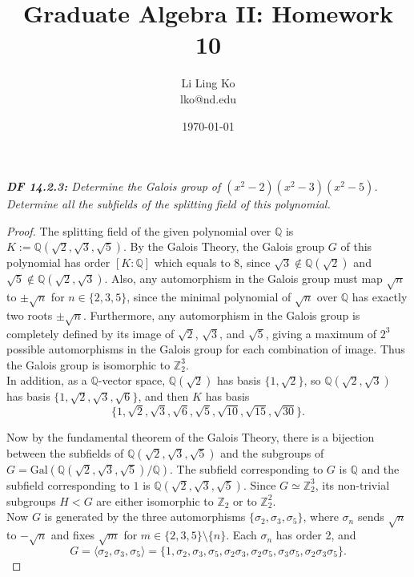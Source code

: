 \documentclass{article}
\begin{document}
\title{Graduate Algebra II: Homework 10}
\author{Li Ling Ko\\ lko@nd.edu}
\date{\today}
\maketitle

\it \textbf{DF 14.2.3:} Determine the Galois group of
  $(x^2-2)(x^2-3)(x^2-5)$. Determine all the subfields of the splitting
  field of this polynomial.

  \begin{proof}
    The splitting field of the given polynomial over $\mathbb{Q}$ is
    $K:=\mathbb{Q}(\sqrt{2},\sqrt{3},\sqrt{5})$. By the Galois Theory, the
    Galois group $G$ of this polynomial has order
    $[K:\mathbb{Q}]$ which equals to
    8, since $\sqrt{3}\not\in\mathbb{Q}(\sqrt{2})$ and
    $\sqrt{5}\not\in\mathbb{Q}(\sqrt{2},\sqrt{3})$. Also, any automorphism
    in the Galois group must map $\sqrt{n}$ to $\pm\sqrt{n}$ for
    $n\in\{2,3,5\}$, since the minimal polynomial of $\sqrt{n}$ over
    $\mathbb{Q}$ has exactly two roots $\pm\sqrt{n}$. Furthermore, any
    automorphism in the Galois group is completely defined by its image of
    $\sqrt{2}$, $\sqrt{3}$, and $\sqrt{5}$, giving a maximum of $2^3$
    possible automorphisms in the Galois group for each combination of
    image. Thus the Galois group is isomorphic to $\mathbb{Z}_2^3$. \\

    In addition, as a $\mathbb{Q}$-vector space,
    $\mathbb{Q}(\sqrt{2})$ has basis $\{1,\sqrt{2}\}$, so
    $\mathbb{Q}(\sqrt{2},\sqrt{3})$ has basis
    $\{1,\sqrt{2},\sqrt{3},\sqrt{6}\}$, and then $K$ has basis
    \[\{1,\sqrt{2},\sqrt{3},\sqrt{6},
    \sqrt{5},\sqrt{10},\sqrt{15},\sqrt{30}\}.\]

    Now by the fundamental theorem of the Galois Theory, there is a bijection
    between the subfields of $\mathbb{Q}(\sqrt{2},\sqrt{3},\sqrt{5})$ and
    the subgroups of $G= \text{Gal}(\mathbb{Q}(\sqrt{2},\sqrt{3},\sqrt{5})
    /\mathbb{Q})$. The subfield corresponding to $G$ is $\mathbb{Q}$ and
    the subfield corresponding to $1$ is
    $\mathbb{Q}(\sqrt{2},\sqrt{3},\sqrt{5})$. Since
    $G\simeq\mathbb{Z}_2^3$, its non-trivial subgroups $H<G$ are either
    isomorphic to $\mathbb{Z}_2$ or to $\mathbb{Z}_2^2$. \\

    Now $G$ is generated by the three automorphisms
    $\{\sigma_2,\sigma_3,\sigma_5\}$, where $\sigma_n$ sends $\sqrt{n}$ to
    $-\sqrt{n}$ and fixes $\sqrt{m}$ for $m\in\{2,3,5\}\setminus\{n\}$.
    Each $\sigma_n$ has order 2, and
    \[G =\langle\sigma_2,\sigma_3,\sigma_5\rangle
    =\{1,\sigma_2,\sigma_3,\sigma_5, \sigma_2\sigma_3, \sigma_2\sigma_5,
    \sigma_3\sigma_5, \sigma_2\sigma_3\sigma_5\}.\]


\end{proof}
\end{document}
